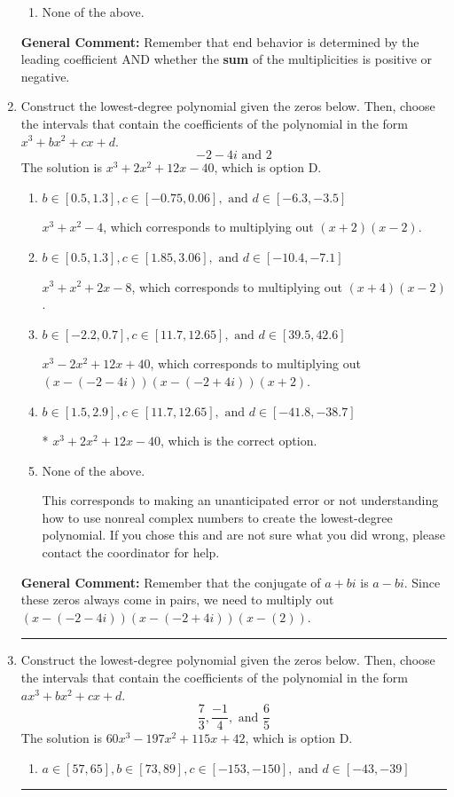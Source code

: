 \documentclass{extbook}[14pt]
\newcommand{\litem}[1]{\item #1

\rule{\textwidth}{0.4pt}}
\begin{document}
\begin{enumerate}
{\begin{enumerate}[label=\Alph*.]
\begin{multicols}{2}
\end{multicols}\item None of the above.\end{enumerate}
\textbf{General Comment:} Remember that end behavior is determined by the leading coefficient AND whether the \textbf{sum} of the multiplicities is positive or negative.
}
\litem{
Construct the lowest-degree polynomial given the zeros below. Then, choose the intervals that contain the coefficients of the polynomial in the form $x^3+bx^2+cx+d$.
\[ -2 - 4 i \text{ and } 2 \]The solution is \( x^{3} +2 x^{2} +12 x -40 \), which is option D.\begin{enumerate}[label=\Alph*.]
\item \( b \in [0.5, 1.3], c \in [-0.75, 0.06], \text{ and } d \in [-6.3, -3.5] \)

$x^{3} + x^{2} -4$, which corresponds to multiplying out $(x + 2)(x -2)$.
\item \( b \in [0.5, 1.3], c \in [1.85, 3.06], \text{ and } d \in [-10.4, -7.1] \)

$x^{3} + x^{2} +2 x -8$, which corresponds to multiplying out $(x + 4)(x -2)$.
\item \( b \in [-2.2, 0.7], c \in [11.7, 12.65], \text{ and } d \in [39.5, 42.6] \)

$x^{3} -2 x^{2} +12 x + 40$, which corresponds to multiplying out $(x-(-2 - 4 i))(x-(-2 + 4 i))(x + 2)$.
\item \( b \in [1.5, 2.9], c \in [11.7, 12.65], \text{ and } d \in [-41.8, -38.7] \)

* $x^{3} +2 x^{2} +12 x -40$, which is the correct option.
\item \( \text{None of the above.} \)

This corresponds to making an unanticipated error or not understanding how to use nonreal complex numbers to create the lowest-degree polynomial. If you chose this and are not sure what you did wrong, please contact the coordinator for help.
\end{enumerate}

\textbf{General Comment:} Remember that the conjugate of $a+bi$ is $a-bi$. Since these zeros always come in pairs, we need to multiply out $(x-(-2 - 4 i))(x-(-2 + 4 i))(x-(2))$.
}
\litem{
Construct the lowest-degree polynomial given the zeros below. Then, choose the intervals that contain the coefficients of the polynomial in the form $ax^3+bx^2+cx+d$.
\[ \frac{7}{3}, \frac{-1}{4}, \text{ and } \frac{6}{5} \]The solution is \( 60x^{3} -197 x^{2} +115 x + 42 \), which is option D.\begin{enumerate}[label=\Alph*.]
\item \( a \in [57, 65], b \in [73, 89], c \in [-153, -150], \text{ and } d \in [-43, -39] \)


\end{enumerate}}
\end{enumerate}
\end{document}
